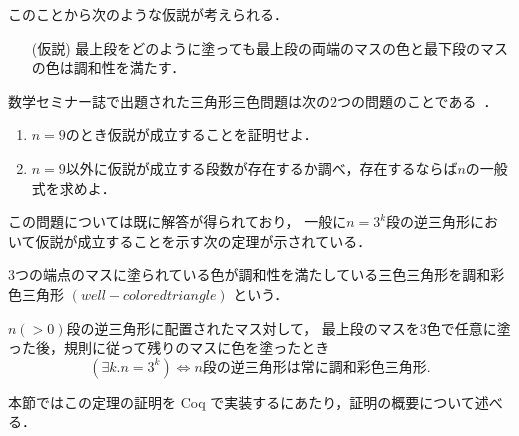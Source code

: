 このことから次のような仮説が考えられる．
\begin{itemize}
  \item[(仮説)]
  最上段をどのように塗っても最上段の両端のマスの色と最下段のマスの色は調和性を満たす．
\end{itemize}

数学セミナー誌で出題された三角形三色問題は次の$2$つの問題のことである~\cite{Nishiyama2}．
\begin{enumerate}
\item \label{que:1}
  $n=9$のとき仮説が成立することを証明せよ．
\item \label{que:2}
  $n=9$以外に仮説が成立する段数が存在するか調べ，存在するならば$n$の一般式を求めよ．
\end{enumerate}

この問題については既に解答が得られており，
一般に$n=3^k$段の逆三角形において仮説が成立することを示す次の定理が示されている．

\begin{dfn}[調和彩色三角形] \label{dfn:wc_tri}
  $3$つの端点のマスに塗られている色が調和性を満たしている三色三角形を調和彩色三角形 $(well-colored triangle)$ という．
\end{dfn}

\begin{thm} \label{thm:tri_iff}
  $n(>0)$段の逆三角形に配置されたマス対して，
  最上段のマスを$3$色で任意に塗った後，規則に従って残りのマスに色を塗ったとき
  \[
  (\exists k.n=3^k) \Leftrightarrow \text{$n$段の逆三角形は常に調和彩色三角形}.
  \]
\end{thm}

本節ではこの定理の証明を Coq で実装するにあたり，証明の概要について述べる．


